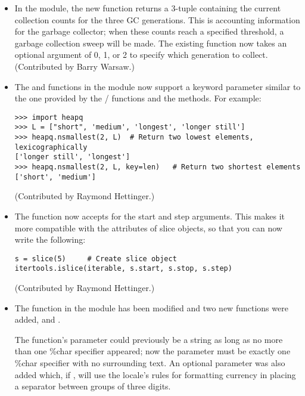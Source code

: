 \documentclass{howto}
\begin{document}
\begin{itemize}
\item In the  module, the new  function
returns a 3-tuple containing the current collection counts for the
three GC generations.  This is accounting information for the garbage
collector; when these counts reach a specified threshold, a garbage
collection sweep will be made.  The existing 
function now takes an optional  argument of 0, 1, or 2
to specify which generation to collect.
(Contributed by Barry Warsaw.)

\item The  and 
 functions in the  module 
now support a  keyword parameter similar to the one
provided by the / functions
and the  methods.  For example:

\begin{verbatim}
>>> import heapq
>>> L = ["short", 'medium', 'longest', 'longer still']
>>> heapq.nsmallest(2, L)  # Return two lowest elements, lexicographically
['longer still', 'longest']
>>> heapq.nsmallest(2, L, key=len)   # Return two shortest elements
['short', 'medium']
\end{verbatim}

(Contributed by Raymond Hettinger.)

\item The  function now accepts
 for the start and step arguments.  This makes it more
compatible with the attributes of slice objects, so that you can now write
the following:

\begin{verbatim}
s = slice(5)     # Create slice object
itertools.islice(iterable, s.start, s.stop, s.step)
\end{verbatim}

(Contributed by Raymond Hettinger.)

\item The  function in the  module
has been modified and two new functions were added,
 and .

The  function's  parameter could
previously be a string as long as no more than one \%char specifier
appeared; now the parameter must be exactly one \%char specifier with
no surrounding text.  An optional  parameter was also
added which, if , will use the locale's rules for
formatting currency in placing a separator between groups of three
digits.


\end{itemize}
\end{document}
